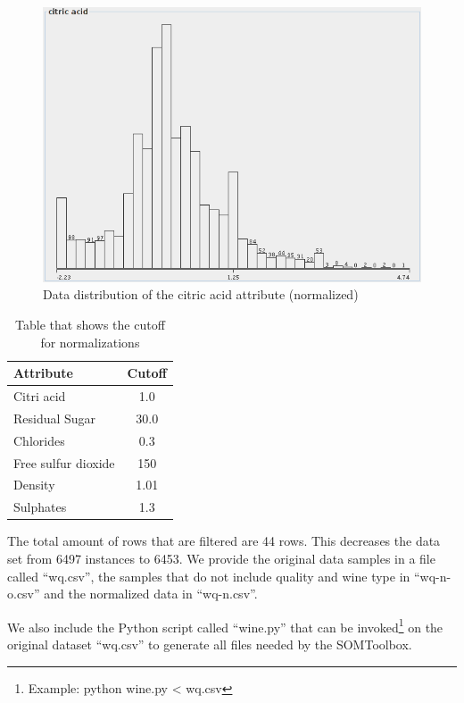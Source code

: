 \documentclass{acm_proc_article-sp}
\begin{document}
\begin{figure}
\centering
\includegraphics[width=\linewidth]{img/ndist-citric-acid}
\caption{Data distribution of the citric acid attribute (normalized)}
\label{fig:ndist-citric-acid}
\end{figure}

\begin{table}
\centering
\begin{tabular}{l|c}
    Attribute & Cutoff \\
    \hline
    \hline
    Citri acid & 1.0 \\
    \hline
    Residual Sugar & 30.0 \\
    \hline
    Chlorides & 0.3 \\
    \hline
    Free sulfur dioxide & 150 \\
    \hline
    Density & 1.01 \\
    \hline
    Sulphates & 1.3 \\
\end{tabular}
\caption{Table that shows the cutoff for normalizations}
\label{tab:cutoff}
\end{table}

The total amount of rows that are filtered are 44 rows. This decreases the data set from 6497 instances to 6453.
We provide the original data samples in a file called ``wq.csv'', the samples that do not include quality and wine type
in ``wq-n-o.csv'' and the normalized data in ``wq-n.csv''.

We also include the Python script called ``wine.py'' that can be invoked\footnote{Example: python wine.py < wq.csv} on the original dataset ``wq.csv'' to generate all files needed by the SOMToolbox.
\end{document}
